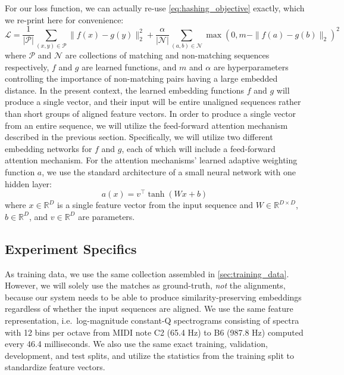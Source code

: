 For our loss function, we can actually re-use \cref{eq:hashing_objective} exactly, which we re-print here for convenience:
\begin{equation}
\mathcal{L} = \frac{1}{|\mathcal{P}|} \sum_{(x, y) \in \mathcal{P}} \| f(x) - g(y) \|_2^2  + \frac{\alpha}{|\mathcal{N}|} \sum_{(a, b) \in \mathcal{N}} \max(0, m - \|f(a) - g(b) \|_2)^2
\label{eq:embedding_objective}
\end{equation}
where $\mathcal{P}$ and $\mathcal{N}$ are collections of matching and non-matching sequences respectively, $f$ and $g$ are learned functions, and $m$ and $\alpha$ are hyperparameters controlling the importance of non-matching pairs having a large embedded distance.
In the present context, the learned embedding functions $f$ and $g$ will produce a single vector, and their input will be entire unaligned sequences rather than short groups of aligned feature vectors.
In order to produce a single vector from an entire sequence, we will utilize the feed-forward attention mechanism described in the previous section.
Specifically, we will utilize two different embedding networks for $f$ and $g$, each of which will include a feed-forward attention mechanism.
For the attention mechanisms' learned adaptive weighting function $a$, we use the standard architecture of a small neural network with one hidden layer:
\begin{equation}
a(x) = v^\top\tanh(Wx + b)
\label{eq:weighting_function}
\end{equation}
where $x \in \mathbb{R}^D$ is a single feature vector from the input sequence and $W \in \mathbb{R}^{D \times D}$, $b \in \mathbb{R}^D$, and $v \in \mathbb{R}^D$ are parameters.

\subsection{Experiment Specifics}

As training data, we use the same collection assembled in \cref{sec:training_data}.
However, we will solely use the matches as ground-truth, {\em not} the alignments, because our system needs to be able to produce similarity-preserving embeddings regardless of whether the input sequences are aligned.
We use the same feature representation, i.e.\ log-magnitude constant-Q spectrograms consisting of spectra with 12 bins per octave from MIDI note C2 (65.4 Hz) to B6 (987.8 Hz) computed every 46.4 milliseconds.
We also use the same exact training, validation, development, and test splits, and utilize the statistics from the training split to standardize feature vectors.

